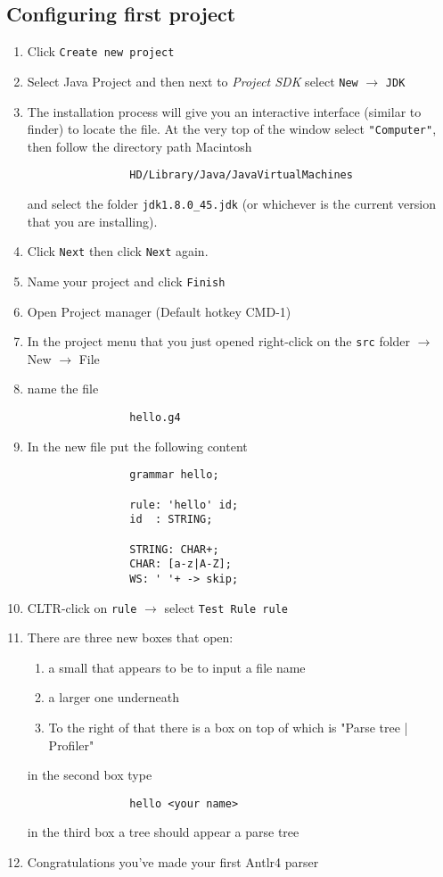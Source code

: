 \documentclass{article}
\begin{document}
	\subsection{Configuring first project}
		\begin{enumerate}
			\item Click \texttt{Create new project}
			\item Select Java Project and then next to \textit{Project SDK} select \texttt{New} $\rightarrow$ \texttt{JDK}
			\item The installation process will give you an interactive interface (similar to finder) to locate the
			file. At the very top of the window select \texttt{"Computer"}, then follow the directory path Macintosh
			\begin{lstlisting}
				HD/Library/Java/JavaVirtualMachines
			\end{lstlisting}
			and select the folder \texttt{jdk1.8.0\_45.jdk} (or whichever is the current version that you are
			installing).
			\item Click \texttt{Next} then click \texttt{Next} again.
			\item Name your project and click \texttt{Finish}
			\item Open Project manager (Default hotkey CMD-1)
			\item In the project menu that you just opened right-click on the \texttt{src} folder $\rightarrow$ New $\rightarrow$ File
			\item name the file
			\begin{lstlisting}
				hello.g4
			\end{lstlisting}
			\item In the new file put the following content
			\begin{lstlisting}
				grammar hello;

				rule: 'hello' id;
				id  : STRING;

				STRING: CHAR+;
				CHAR: [a-z|A-Z];
				WS: ' '+ -> skip;
			\end{lstlisting}
			\item CLTR-click on \texttt{rule} $\rightarrow$ select \texttt{Test Rule rule}
			\item There are three new boxes that open:
			\begin{enumerate}
				\item a small that appears to be to input a file name
				\item a larger one underneath
				\item To the right of that there is a box on top of which is "Parse tree | Profiler"
			\end{enumerate}
			in the second box type
			\begin{lstlisting}
				hello <your name>
			\end{lstlisting}
			in the third box a tree should appear a parse tree
			\item Congratulations you've made your first Antlr4 parser

		\end{enumerate}
\end{document}
